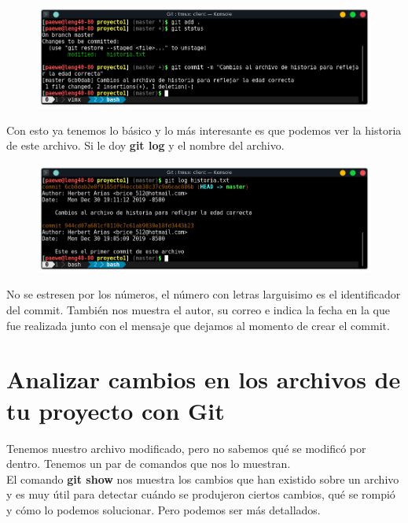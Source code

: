 \documentclass{article}
\begin{document}
\begin{figure}[h!]
  \centering
  \includegraphics[scale=0.75]{./Pictures/083_commit.png}
\end{figure}

Con esto ya tenemos lo básico y lo más interesante es que podemos ver la
historia de este archivo. Si le doy \textbf{git log} y el nombre del archivo.

\begin{figure}[h!]
  \centering
  \includegraphics[scale=0.75]{./Pictures/084_git_log.png}
\end{figure}

No se estresen por los números, el número con letras larguisimo es el
identificador del commit. También nos muestra el autor, su correo e indica la
fecha en la que fue realizada junto con el mensaje que dejamos al momento de
crear el commit.



\newpage

\section{Analizar cambios en los archivos de tu proyecto con Git}%

Tenemos nuestro archivo modificado, pero no sabemos qué se modificó por dentro.
Tenemos un par de comandos que nos lo muestran.\\

El comando \textbf{git show} nos muestra los cambios que han existido sobre un
archivo y es muy útil para detectar cuándo se produjeron ciertos cambios, qué
se rompió y cómo lo podemos solucionar. Pero podemos ser más detallados.\\
\end{document}
